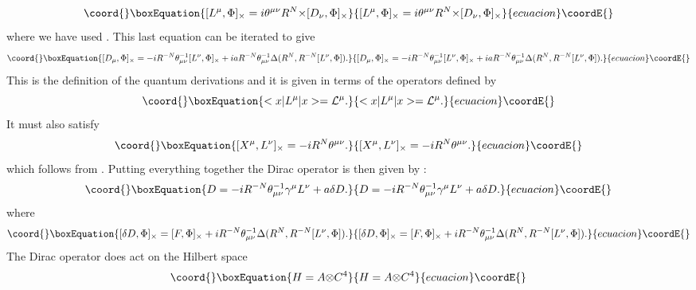 \documentclass[a4paper,12pt]{article}
\begin{document}
\begin{equation}\coord{}\boxEquation{
[L^{\mu},\Phi]_{\times}=i{\theta}^{{\mu}{\nu}}R^N{\times}[D_{\nu},{\Phi}]_{\times}
}{
[L^{\mu},\Phi]_{\times}=i{\theta}^{{\mu}{\nu}}R^N{\times}[D_{\nu},{\Phi}]_{\times}
}{ecuacion}\coordE{}\end{equation}
where we have used \coordHE{} . This last equation can be iterated
to give
\begin{equation}\coord{}\boxEquation{
[D_{\mu},\Phi]_{\times}=-iR^{-N}{\theta}^{-1}_{{\mu}{\nu}}[L^{\nu},\Phi]_{\times}
+
iaR^{-N}{\theta}^{-1}_{{\mu}{\nu}}{\Delta}(R^N,R^{-N}[L^{\nu},\Phi]).
}{
[D_{\mu},\Phi]_{\times}=-iR^{-N}{\theta}^{-1}_{{\mu}{\nu}}[L^{\nu},\Phi]_{\times}
+
iaR^{-N}{\theta}^{-1}_{{\mu}{\nu}}{\Delta}(R^N,R^{-N}[L^{\nu},\Phi]).
}{ecuacion}\coordE{}\end{equation}
This is the definition of the quantum derivations \coordHE{} and
it is given in terms of the operators \coordHE{} defined by
\begin{equation}\coord{}\boxEquation{
<x|L^{\mu}|x>={\cal L}^{\mu}.
}{
<x|L^{\mu}|x>={\cal L}^{\mu}.
}{ecuacion}\coordE{}\end{equation}
It must also satisfy
\begin{equation}\coord{}\boxEquation{
[X^{\mu},L^{\nu}]_{\times}=-iR^{N}{\theta}^{{\mu}{\nu}}.
}{
[X^{\mu},L^{\nu}]_{\times}=-iR^{N}{\theta}^{{\mu}{\nu}}.
}{ecuacion}\coordE{}\end{equation}
which follows from \coordHE{} . Putting everything together the
Dirac operator is then given by :
\begin{equation}\coord{}\boxEquation{
D=-iR^{-N}{\theta}^{-1}_{{\mu}{\nu}}{\gamma}^{\mu}L^{\nu} +
a{\delta}D.
}{
D=-iR^{-N}{\theta}^{-1}_{{\mu}{\nu}}{\gamma}^{\mu}L^{\nu} +
a{\delta}D.
}{ecuacion}\coordE{}\end{equation}
where
\begin{equation}\coord{}\boxEquation{
[{\delta}D,\Phi]_{\times}=[F,\Phi]_{\times}+iR^{-N}{\theta}^{-1}_{{\mu}{\nu}}{\Delta}(R^N,R^{-N}[L^{\nu},\Phi]).
}{
[{\delta}D,\Phi]_{\times}=[F,\Phi]_{\times}+iR^{-N}{\theta}^{-1}_{{\mu}{\nu}}{\Delta}(R^N,R^{-N}[L^{\nu},\Phi]).
}{ecuacion}\coordE{}\end{equation}
The Dirac operator \coordHE{} does act on the Hilbert space
\begin{equation}\coord{}\boxEquation{
H=A{\otimes}{C}^4
}{
H=A{\otimes}{C}^4
}{ecuacion}\coordE{}\end{equation}
\end{document}
